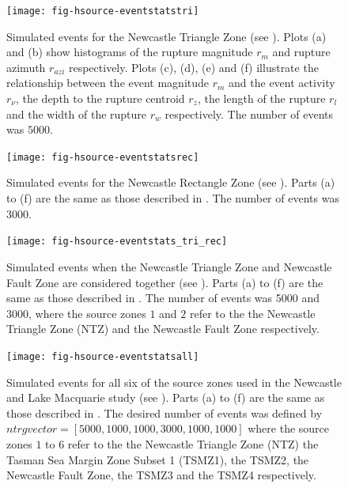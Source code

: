\begin{figure}
  \vspace{0.8em}
\begin{center}
\texttt{[image: fig-hsource-eventstatstri]}
\end{center}
\caption{Simulated events for the Newcastle Triangle Zone (see
\citealt{dr_Dhu02b}). Plots (a) and (b) show histograms of the
rupture magnitude $r_m$ and rupture azimuth $r_{azi}$
respectively. Plots (c), (d), (e) and (f) illustrate the
relationship between the event magnitude $r_m$ and the event
activity $r_\nu$, the depth to the rupture centroid $r_z$, the
length of the rupture $r_l$ and the width of the rupture $r_w$
respectively. The number of events was
$5000$.} \label{fig:source-catalogue-results1}
\end{figure}

\begin{figure}
\begin{center}
\texttt{[image: fig-hsource-eventstatsrec]}
\end{center}
\caption{Simulated events for the Newcastle Rectangle Zone (see
\citealt{dr_Dhu02b}). Parts (a) to (f) are the same as those
described in . The number of events was $3000$.}
\label{fig:source-catalogue-results2}
\end{figure}

\begin{figure}
\begin{center}
\texttt{[image: fig-hsource-eventstats\_tri\_rec]}
\end{center}
 \caption{Simulated
events when the Newcastle Triangle Zone and Newcastle Fault Zone
are considered together (see \citealt{dr_Dhu02b}). Parts (a) to
(f) are the same as those described in
. The number of events
was 5000 and 3000, where the source zones
$1$ and $2$ refer to the the Newcastle Triangle Zone (NTZ) and the
Newcastle Fault Zone respectively.}
\label{fig:source-catalogue-results3}
\end{figure}



\begin{figure}
\begin{center}
\texttt{[image: fig-hsource-eventstatsall]}
\end{center}
\caption{Simulated events for all six of the source zones used in
the Newcastle and Lake Macquarie study (see \citealt{dr_Dhu02b}).
Parts (a) to (f) are the same as those described in
. The desired number of events
was defined by $ntrgvector = [5000,1000,1000,3000,1000,1000]$
where the source zones $1$ to $6$ refer to the the Newcastle
Triangle Zone (NTZ) the Tasman Sea Margin Zone Subset 1 (TSMZ1),
the TSMZ2, the Newcastle Fault Zone, the TSMZ3 and the TSMZ4
respectively.} \label{fig:source-catalogue-results4}
\end{figure}



